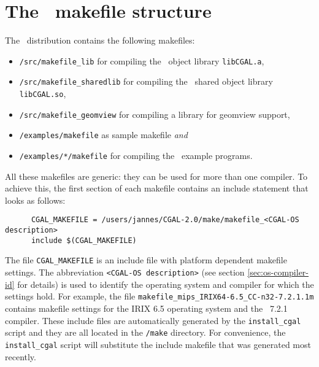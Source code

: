 \section{The \cgal\ makefile structure}\label{sec:makefiles}

The \cgal\ distribution contains the following makefiles:
\begin{itemize}
\item \texttt{\cgaldir/src/makefile\_lib} for compiling the \cgal\ 
  object library \texttt{libCGAL.a},
  
\item \texttt{\cgaldir/src/makefile\_sharedlib} for compiling the
  \cgal\ shared object library \texttt{libCGAL.so},
  
\item \texttt{\cgaldir/src/makefile\_geomview} for compiling a library
  for geomview support,
  
\item \texttt{\cgaldir/examples/makefile} as sample makefile
  \textit{and}
  
\item \texttt{\cgaldir/examples/*/makefile} for compiling the \cgal\ 
  example programs.
\end{itemize}

All these makefiles are generic: they can be used for more than one
compiler.  To achieve this, the first section of each makefile
contains an include statement that looks as follows:

\begin{verbatim}
      CGAL_MAKEFILE = /users/jannes/CGAL-2.0/make/makefile_<CGAL-OS description>
      include $(CGAL_MAKEFILE)
\end{verbatim}

The file \texttt{CGAL\_MAKEFILE} is an include file with platform
dependent makefile settings. The abbreviation \texttt{<CGAL-OS
  description>} (see section \ref{sec:os-compiler-id} for details) is
used to identify the operating system and compiler for which the
settings hold. For example, the file
\texttt{makefile\_mips\_IRIX64-6.5\_CC-n32-7.2.1.1m} contains makefile
settings for the IRIX 6.5 operating system and the \mipsprocc\ 7.2.1
compiler.  These include files are automatically generated by the
\texttt{install\_cgal} script and they are all located in the
\texttt{\cgaldir/make} directory.  For convenience, the
\texttt{install\_cgal} script will substitute the include makefile
that was generated most recently.

